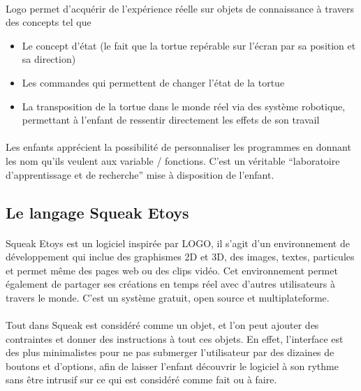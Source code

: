 \documentclass[a4paper]{article}
\begin{document}
\paragraph{}
Logo permet d’acquérir de l’expérience réelle sur objets de connaissance à travers des concepts tel que 
\begin{itemize}
\item Le concept d’état (le fait que la tortue repérable sur l’écran par sa position et sa direction)
\item Les commandes qui permettent de changer l’état de la tortue
\item La transposition de la tortue dans le monde réel via des système robotique, permettant à l’enfant de ressentir directement les effets de son travail
\end{itemize}

\paragraph{}
Les enfants apprécient la possibilité de personnaliser les programmes en donnant les nom qu’ils veulent aux variable / fonctions. C’est un véritable “laboratoire d’apprentissage et de recherche” mise à disposition de l’enfant.

\subsection{Le langage Squeak Etoys}

\paragraph{}
Squeak Etoys \cite{kay2005squeak} est un logiciel inspirée par LOGO, il s’agit d’un environnement de développement qui inclue des graphismes 2D et 3D, des images, textes, particules et permet même des pages web ou des clips vidéo. Cet environnement permet également de partager ses créations en temps réel avec d’autres utilisateurs à travers le monde. C’est un système gratuit, open source et multiplateforme.

\paragraph{}
Tout dans Squeak est considéré comme un objet, et l’on peut ajouter des contraintes et donner des instructions à tout ces objets. En effet, l’interface est des plus minimalistes pour ne pas submerger l’utilisateur par des dizaines de boutons et d’options, afin de laisser l’enfant découvrir le logiciel à son rythme sans être intrusif sur ce qui est considéré comme fait ou à faire.
\end{document}
